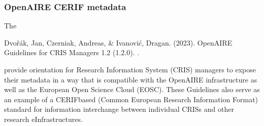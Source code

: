\documentclass[a4paper,10pt,english]{sphinxmanual}
\begin{document}
\subsubsection{OpenAIRE CERIF metadata}
\label{\detokenize{white-paper/linking-datasets:openaire-cerif-metadata}}
\sphinxAtStartPar
The  %
\begin{footnote}[6]\sphinxAtStartFootnote
Dvořák, Jan, Czerniak, Andreas, \& Ivanović, Dragan. (2023). OpenAIRE
Guidelines for CRIS Managers 1.2 (1.2.0). .
%
\end{footnote}
provide orientation for Research Information System (CRIS) managers to
expose their metadata in a way that is compatible with the OpenAIRE
infrastructure as well as the European Open Science Cloud (EOSC).
These Guidelines also serve as an example of a CERIF\sphinxhyphen{}based (Common
European Research Information Format) standard for information
interchange between individual CRISs and other research
e\sphinxhyphen{}Infrastructures.
\end{document}
